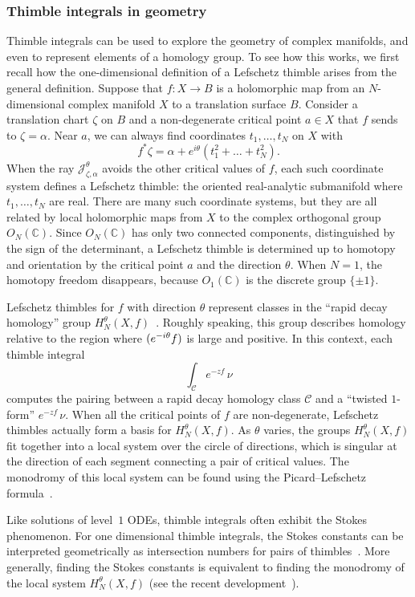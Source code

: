 \documentclass{article}
\let\Re\relax
\DeclareMathOperator{\Re}{Re}
\newcommand{\maps}{\colon}
\newcommand{\C}{\mathbb{C}}
\theoremstyle{definition}
\theoremstyle{plain}
\begin{document}
\subsubsection{Thimble integrals in geometry}
Thimble integrals can be used to explore the geometry of complex manifolds, and even to represent elements of a homology group. To see how this works, we first recall how the one-dimensional definition of a Lefschetz thimble arises from the general definition. Suppose that $f \maps X \to B$ is a holomorphic map from an $N$-dimensional complex manifold $X$ to a translation surface $B$. Consider a translation chart $\zeta$ on $B$ and a non-degenerate critical point $a \in X$ that $f$ sends to $\zeta = \alpha$. Near $a$, we can always find coordinates $t_1, \ldots, t_N$ on $X$ with
\[ f^*\zeta = \alpha + e^{i \theta} (t_1^2 + \ldots + t_N^2). \]
When the ray $\mathcal{J}_{\zeta, \alpha}^\theta$ avoids the other critical values of $f$, each such coordinate system defines a Lefschetz thimble: the oriented real-analytic submanifold where $t_1, \ldots, t_N$ are real. There are many such coordinate systems, but they are all related by local holomorphic maps from $X$ to the complex orthogonal group $O_N(\C)$. Since $O_N(\C)$ has only two connected components, distinguished by the sign of the determinant, a Lefschetz thimble is determined up to homotopy and orientation by the critical point $a$ and the direction $\theta$. When $N = 1$, the homotopy freedom disappears, because $O_1(\C)$ is the discrete group $\{\pm 1\}$.

Lefschetz thimbles for $f$ with direction $\theta$ represent classes in the ``rapid decay homology'' group $H^\theta_N(X,f)$~\cite{pham}\cite[Section~1.1]{fresan-notes}. Roughly speaking, this group describes homology relative to the region where $\Re(e^{-i\theta} f)$ is large and positive. In this context, each thimble integral
\[ \int_{\mathcal{C}}e^{-zf}\,\nu \]
computes the pairing between a rapid decay homology class $\mathcal{C}$ and a ``twisted $1$-form'' $e^{-zf}\,\nu$. When all the critical points of $f$ are non-degenerate, Lefschetz thimbles actually form a basis for $H^\theta_N(X,f)$. As $\theta$ varies, the groups $H^\theta_N(X,f)$ fit together into a local system over the circle of directions, which is singular at the direction of each segment connecting a pair of critical values. The monodromy of this local system can be found using the Picard--Lefschetz formula~\cite[Section~1]{Arnold}\cite[Section~3.3, Part II]{pham}.

Like solutions of level~$1$ ODEs, thimble integrals often exhibit the Stokes phenomenon. For one dimensional thimble integrals, the Stokes constants can be interpreted geometrically as intersection numbers for pairs of thimbles~\cite{kontsevich2022analyticity}. More generally, finding the Stokes constants is equivalent to finding the monodromy of the local system $H^\theta_N(X,f)$ (see the recent development~\cite{kontsevich2024holomorphic}).
%
\end{document}
